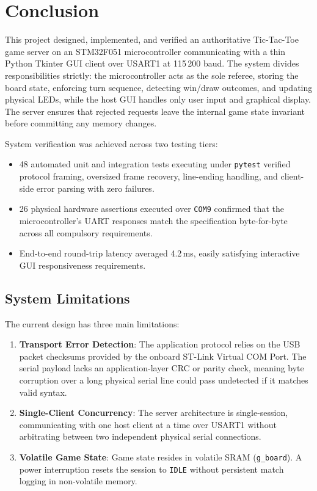 \section{Conclusion}
\label{sec:conclusion}


This project designed, implemented, and verified an authoritative Tic-Tac-Toe game server on an STM32F051 microcontroller communicating with a thin Python Tkinter GUI client over USART1 at 115\,200 baud.
The system divides responsibilities strictly: the microcontroller acts as the sole referee, storing the board state, enforcing turn sequence, detecting win/draw outcomes, and updating physical LEDs, while the host GUI handles only user input and graphical display.
The server ensures that rejected requests leave the internal game state invariant before committing any memory changes.

System verification was achieved across two testing tiers:
\begin{itemize}
    \item 48 automated unit and integration tests executing under \texttt{pytest} verified protocol framing, oversized frame recovery, line-ending handling, and client-side error parsing with zero failures.
    \item 26 physical hardware assertions executed over \texttt{COM9} confirmed that the microcontroller's UART responses match the specification byte-for-byte across all compulsory requirements.
    \item End-to-end round-trip latency averaged 4.2\,ms, easily satisfying interactive GUI responsiveness requirements.
\end{itemize}

\subsection{System Limitations}
The current design has three main limitations:
\begin{enumerate}
    \item \textbf{Transport Error Detection}: The application protocol relies on the USB packet checksums provided by the onboard ST-Link Virtual COM Port. The serial payload lacks an application-layer CRC or parity check, meaning byte corruption over a long physical serial line could pass undetected if it matches valid syntax.
    \item \textbf{Single-Client Concurrency}: The server architecture is single-session, communicating with one host client at a time over USART1 without arbitrating between two independent physical serial connections.
    \item \textbf{Volatile Game State}: Game state resides in volatile SRAM (\texttt{g\_board}). A power interruption resets the session to \texttt{IDLE} without persistent match logging in non-volatile memory.
\end{enumerate}

